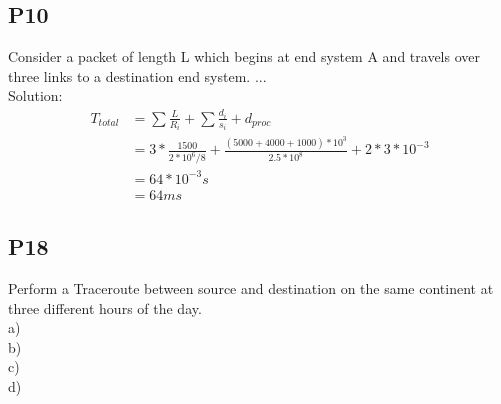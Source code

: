 \documentclass{article}
\begin{document}
\subsection{P10}
Consider a packet of length L which begins at end system A and travels over three links to a destination end system. ...
\\
    Solution:
  \begin{align}
  T_{total} &= \sum{\frac{L}{R_i}} + \sum{\frac{d_i}{s_i}} + d_{proc}\\
     & = 3 * \frac{1500}{2*10^6/8} + \frac{(5000 + 4000 + 1000)*10^3}{2.5*10^8} + 2*3*10^{-3}\\
     & = 64*10^{-3}s\\
     &= 64ms
  \end{align}

\subsection{P18}
Perform a Traceroute between source and destination on the same continent at three different hours of the day.\\
a)\\
b)\\
c)\\
d)\\
\end{document}

